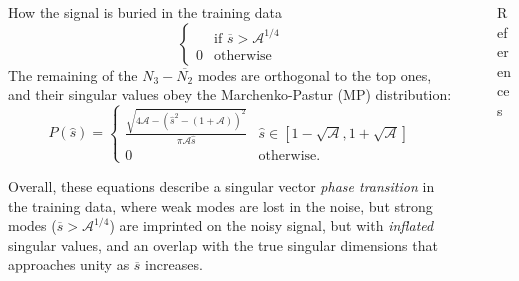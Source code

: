 \documentclass[final]{beamer}
\begin{document}
\begin{frame}[t]{}
\begin{columns}
\begin{column}{0.25\textwidth}
\begin{block}{\large How the signal is buried in the training data}
\begin{equation}
\begin{cases}
& \text{if } \overline{s} > \mathcal{A}^{1/4} \\
0 & \text{otherwise}
\end{cases}
\label{eq:ovlap}
\end{equation}
The remaining of the $N_3 - \overline{N_2}$ modes are orthogonal to the top ones, and their singular values obey the Marchenko-Pastur (MP) distribution: 
\begin{equation}
P(\hat{s}) = \begin{cases}
\frac{\sqrt{4\mathcal{A}-(\hat{s}^2 - (1+\mathcal{A}))^2}}{\pi \mathcal{A}\hat{s}} & \hat{s} \in [1-\sqrt{\mathcal{A}}, 1+\sqrt{\mathcal{A}}] \\
0 & \text{otherwise}.
\end{cases}
\label{eq:mp}
\end{equation}

Overall, these equations describe a singular vector {\it phase transition} in the training data, where weak modes are lost in the noise, but strong modes ($\overline{s} > \mathcal{A}^{1/4}$) are imprinted on the noisy signal, but with \emph{inflated} singular values, and an overlap with the true singular dimensions that approaches unity as $\overline{s}$ increases.
\end{block}
\end{column}
\begin{column}{0.25\textwidth}
\end{column}
\begin{column}{0.25\textwidth}
\begin{block}{References}
{
\tiny


}
\end{block}
\end{column}
\end{columns}


\end{frame}
\end{document}
